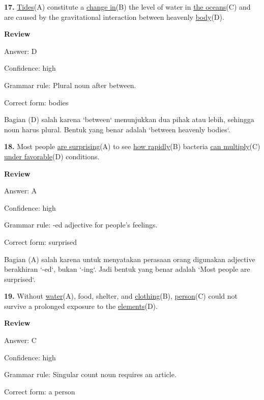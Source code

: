 \documentclass[12pt]{article}
\begin{document}
\endgroup
\par
\vspace{\questionblockgap}
\noindent\textbf{17.} \uline{Tides}(A) constitute a \uline{change in}(B) the level of water in \uline{the oceans}(C) and are caused by the gravitational interaction between heavenly \uline{body}(D).
\par
\begingroup
\setlength{\parskip}{0pt}
\setlength{\parindent}{0pt}
\textbf{Review}\par
Answer: D\par
Confidence: high\par
Grammar rule: Plural noun after between.\par
Correct form: bodies\par
Bagian (D) salah karena `between` menunjukkan dua pihak atau lebih, sehingga noun harus plural. Bentuk yang benar adalah `between heavenly bodies`.\par
\endgroup
\par
\vspace{\questionblockgap}
\noindent\textbf{18.} Most people \uline{are surprising}(A) to see \uline{how rapidly}(B) bacteria \uline{can multiply}(C) \uline{under favorable}(D) conditions.
\par
\begingroup
\setlength{\parskip}{0pt}
\setlength{\parindent}{0pt}
\textbf{Review}\par
Answer: A\par
Confidence: high\par
Grammar rule: -ed adjective for people's feelings.\par
Correct form: surprised\par
Bagian (A) salah karena untuk menyatakan perasaan orang digunakan adjective berakhiran `-ed`, bukan `-ing`. Jadi bentuk yang benar adalah `Most people are surprised`.\par
\endgroup
\par
\vspace{\questionblockgap}
\noindent\textbf{19.} Without \uline{water}(A), food, shelter, and \uline{clothing}(B), \uline{person}(C) could not survive a prolonged exposure to the \uline{elements}(D).
\par
\begingroup
\setlength{\parskip}{0pt}
\setlength{\parindent}{0pt}
\textbf{Review}\par
Answer: C\par
Confidence: high\par
Grammar rule: Singular count noun requires an article.\par
Correct form: a person\par
\end{document}
